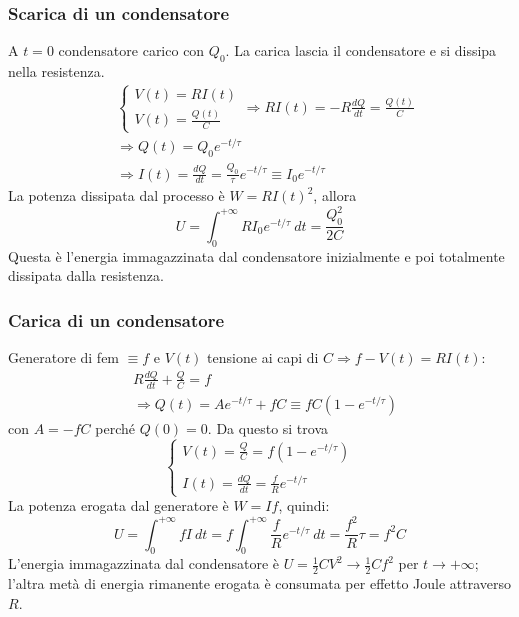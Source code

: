 \documentclass[a4paper]{scrartcl}
\numberwithin{equation}{subsection}
\theoremstyle{style1}
\begin{document}
\subsubsection{Scarica di un condensatore}
A $t=0$ condensatore carico con $Q_0$. La carica lascia il condensatore e si dissipa nella resistenza. 
\begin{equation}
	\begin{split}
		&\begin{cases}
		V(t) = RI(t) \\
		V(t) = \frac{Q(t)}{C} 
	\end{cases}\Rightarrow RI(t) = - R \frac{d Q}{d t} = \frac{Q(t)}{C}\\
		&\Rightarrow Q(t) = Q_0 e^{ - t / \tau }\\
		&\Rightarrow I(t) = \frac{d Q}{d t}  = \frac{Q_0}{\tau }e^{-t / \tau } \equiv I_0 e^{-t / \tau } 
	\end{split}
\end{equation}
La potenza dissipata dal processo \`e $W = RI(t)^2$, allora
\begin{equation}
	U  = \int_{0} ^{+\infty} RI_0e^{-t / \tau } \ dt  = \frac{Q_0^2}{2C}
\end{equation}
Questa \`e l'energia immagazzinata dal condensatore inizialmente e poi totalmente dissipata dalla resistenza.
\subsubsection{Carica di un condensatore}
Generatore di fem $\equiv f$ e $V(t)$ tensione ai capi di $C\Rightarrow f- V(t) = RI(t)$:
\begin{equation}
	\begin{split}
		&R \frac{d Q}{d t}  + \frac{Q}{C} = f\\
		&\Rightarrow Q(t) = Ae^{-t / \tau } + fC \equiv fC(1- e^{- t / \tau } )
	\end{split}
\end{equation}
con $A=-fC$ perch\'e $Q(0) = 0$. Da questo si trova
\begin{equation}
	\begin{cases}
		\displaystyle V(t) = \frac{Q}{C} = f(1- e^{-t / \tau }) \\
		\\
		\displaystyle I(t) = \frac{d Q}{d t} = \frac{f}{R} e^{-t / \tau } 
	\end{cases}
\end{equation}
La potenza erogata dal generatore \`e $W = If$, quindi:
\begin{equation}
	U = \int_{0} ^{+\infty} fI \ dt = f \int_{0} ^{+\infty} \frac{f}{R}e^{-t / \tau } \ dt = \frac{f^2}{R}\tau  = f^2 C
\end{equation}
L'energia immagazzinata dal condensatore \`e $U = \frac{1}{2}CV^2 \to \frac{1}{2}Cf^2$ per $t\to +\infty$; l'altra met\`a di energia rimanente erogata \`e consumata per effetto Joule attraverso $R$.
\end{document}
